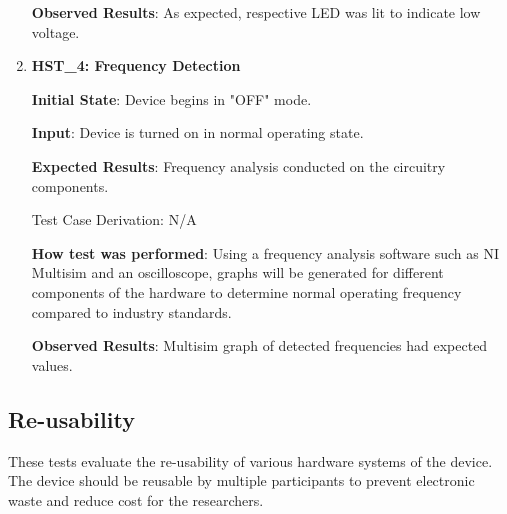 \documentclass[12pt, titlepage]{article}
\begin{document}
\begin{enumerate}
  \textbf{Observed Results}: As expected, respective LED was lit to indicate low voltage.

  \item{\textbf{HST\_4: Frequency Detection}}\label{HST4}

  \textbf{Initial State}: Device begins in "OFF" mode.

  \textbf{Input}: Device is turned on in normal operating state.

  \textbf{Expected Results}: Frequency analysis conducted on the circuitry components.

  Test Case Derivation: N/A

  \textbf{How test was performed}: Using a frequency analysis software such as NI Multisim and an oscilloscope, graphs will be generated for different components of the hardware to determine normal operating frequency compared to industry standards.

  \textbf{Observed Results}: Multisim graph of detected frequencies had expected values.

\end{enumerate}

\subsection{Re-usability}

These tests evaluate the re-usability of various hardware systems of the device. The device should be reusable by multiple participants to prevent electronic waste and reduce cost for the researchers.
\end{document}
